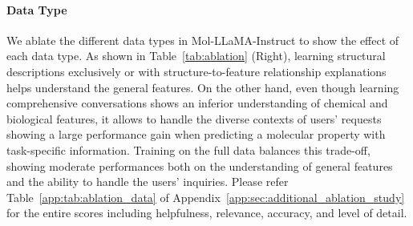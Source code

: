 \vspace{-0.05in}
\paragraph{Data Type} We ablate the different data types in Mol-LLaMA-Instruct to show the effect of each data type. As shown in Table~\ref{tab:ablation} (Right), learning structural descriptions exclusively or with structure-to-feature relationship explanations helps understand the general features. On the other hand, even though learning comprehensive conversations shows an inferior understanding of chemical and biological features, it allows to handle the diverse contexts of users' requests showing a large performance gain when predicting a molecular property with task-specific information. Training on the full data balances this trade-off, showing moderate performances both on the understanding of general features and the ability to handle the users' inquiries. Please refer Table~\ref{app:tab:ablation_data} of Appendix~\ref{app:sec:additional_ablation_study} for the entire scores including helpfulness, relevance, accuracy, and level of detail.
